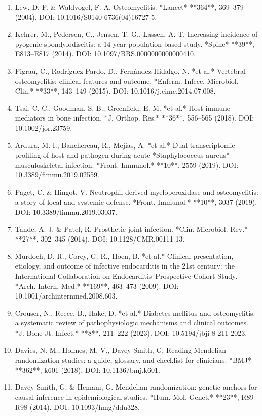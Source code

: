 \documentclass[11pt]{article}
\begin{document}
\begin{enumerate}
\item Lew, D. P. \& Waldvogel, F. A. Osteomyelitis. *Lancet* **364**, 369--379 (2004). DOI: 10.1016/S0140-6736(04)16727-5.
\item Kehrer, M., Pedersen, C., Jensen, T. G., Lassen, A. T. Increasing incidence of pyogenic spondylodiscitis: a 14-year population-based study. *Spine* **39**, E813--E817 (2014). DOI: 10.1097/BRS.0000000000000410.
\item Pigrau, C., Rodríguez-Pardo, D., Fernández-Hidalgo, N. *et al.* Vertebral osteomyelitis: clinical features and outcome. *Enferm. Infecc. Microbiol. Clin.* **33**, 143--149 (2015). DOI: 10.1016/j.eimc.2014.07.008.
\item Tsai, C. C., Goodman, S. B., Greenfield, E. M. *et al.* Host immune mediators in bone infection. *J. Orthop. Res.* **36**, 556--565 (2018). DOI: 10.1002/jor.23759.
\item Ardura, M. I., Banchereau, R., Mejias, A. *et al.* Dual transcriptomic profiling of host and pathogen during acute *Staphylococcus aureus* musculoskeletal infection. *Front. Immunol.* **10**, 2559 (2019). DOI: 10.3389/fimmu.2019.02559.
\item Paget, C. \& Hingot, V. Neutrophil-derived myeloperoxidase and osteomyelitis: a story of local and systemic defense. *Front. Immunol.* **10**, 3037 (2019). DOI: 10.3389/fimmu.2019.03037.
\item Tande, A. J. \& Patel, R. Prosthetic joint infection. *Clin. Microbiol. Rev.* **27**, 302--345 (2014). DOI: 10.1128/CMR.00111-13.
\item Murdoch, D. R., Corey, G. R., Hoen, B. *et al.* Clinical presentation, etiology, and outcome of infective endocarditis in the 21st century: the International Collaboration on Endocarditis--Prospective Cohort Study. *Arch. Intern. Med.* **169**, 463--473 (2009). DOI: 10.1001/archinternmed.2008.603.
\item Crouser, N., Reece, B., Hake, D. *et al.* Diabetes mellitus and osteomyelitis: a systematic review of pathophysiologic mechanisms and clinical outcomes. *J. Bone Jt. Infect.* **8**, 211--222 (2023). DOI: 10.5194/jbji-8-211-2023.
\item Davies, N. M., Holmes, M. V., Davey Smith, G. Reading Mendelian randomization studies: a guide, glossary, and checklist for clinicians. *BMJ* **362**, k601 (2018). DOI: 10.1136/bmj.k601.
\item Davey Smith, G. \& Hemani, G. Mendelian randomization: genetic anchors for causal inference in epidemiological studies. *Hum. Mol. Genet.* **23**, R89--R98 (2014). DOI: 10.1093/hmg/ddu328.

\end{enumerate}
\end{document}
